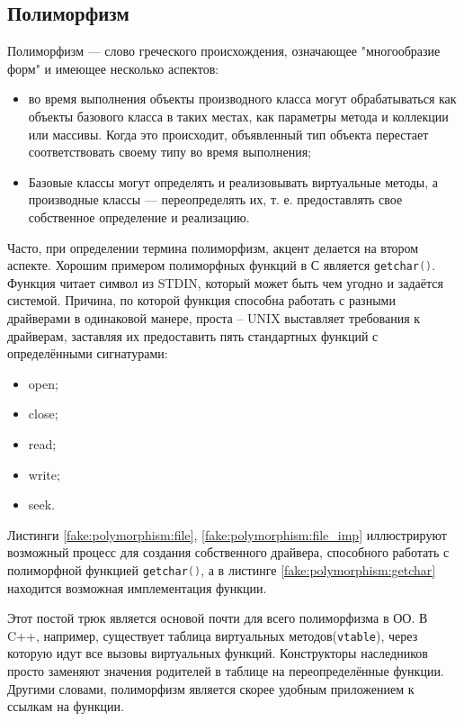 \subsection{Полиморфизм}
\label{sec:polymorphism}

Полиморфизм — слово греческого происхождения, означающее "многообразие форм" и имеющее несколько аспектов\cite{microsoft:poly}:
\begin{itemize}
	\item во время выполнения объекты производного класса могут обрабатываться как объекты базового класса в таких местах, как параметры метода и коллекции или массивы. Когда это происходит, объявленный тип объекта перестает соответствовать своему типу во время выполнения;
	\item Базовые классы могут определять и реализовывать виртуальные методы, а производные классы — переопределять их, т. е. предоставлять свое собственное определение и реализацию.
\end{itemize}

Часто, при определении термина полиморфизм, акцент делается на втором аспекте. Хорошим примером полиморфных функций в С является \lstinline[language=C]{getchar()}. Функция читает символ из STDIN, который может быть чем угодно и задаётся системой. Причина, по которой функция способна работать с разными драйверами в одинаковой манере, проста -- UNIX выставляет требования к драйверам, заставляя их предоставить пять стандартных функций с определёнными сигнатурами: 
\begin{itemize}
	\item open;
	\item close;
	\item read;
	\item write;
	\item seek.
\end{itemize}

Листинги \ref{fake:polymorphism:file}, \ref{fake:polymorphism:file_imp} иллюстрируют возможный процесс для создания собственного драйвера, способного работать с полиморфной функцией \lstinline[language=C]{getchar()}, а в листинге \ref{fake:polymorphism:getchar} находится возможная имплементация функции.

Этот постой трюк является основой почти для всего полиморфизма в ОО. В C++, например, существует таблица виртуальных методов(\texttt{vtable}), через которую идут все вызовы виртуальных функций. Конструкторы наследников просто заменяют значения родителей в таблице на переопределённые функции. Другими словами, полиморфизм является скорее удобным приложением к ссылкам на функции.
